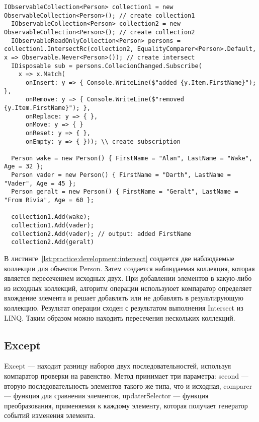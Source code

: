 \begin{lstlisting}[style=csharpinlinestyle, caption={Пример использования Intersect}, label=lst:practice:development:intersect]
  IObservableCollection<Person> collection1 = new ObservableCollection<Person>(); // create collection1
  IObservableCollection<Person> collection2 = new ObservableCollection<Person>(); // create collection2
  IObservableReadOnlyCollection<Person> persons = collection1.IntersectRc(collection2, EqualityComparer<Person>.Default, x => Observable.Never<Person>()); // create intersect
  IDisposable sub = persons.CollecionChanged.Subscribe(
    x => x.Match(
      onInsert: y => { Console.WriteLine($"added {y.Item.FirstName}"); },
      onRemove: y => { Console.WriteLine($"removed {y.Item.FirstName}"); },
      onReplace: y => { },
      onMove: y => { }
      onReset: y => { },
      onEmpty: y => { })); \\ create subscription

  Person wake = new Person() { FirstName = "Alan", LastName = "Wake", Age = 32 };
  Person vader = new Person() { FirstName = "Darth", LastName = "Vader", Age = 45 };
  Person geralt = new Person() { FirstName = "Geralt", LastName = "From Rivia", Age = 60 };

  collection1.Add(wake);
  collection1.Add(vader);
  collection2.Add(vader); // output: added FirstName
  collection2.Add(geralt)
\end{lstlisting}

В листинге~\ref{lst:practice:development:intersect} создается две наблюдаемые коллекции для объектов Person. Затем создается наблюдаемая коллекция, которая является пересечением исходных двух.
При добавлении элементов в какую-либо из исходных коллекций, алгоритм операции используюет компаратор определяет вхождение элемента и решает добавлять или не добавлять в результирующую коллекцию.
Результат операции сходен с результатом выполнения Intersect из LINQ. Таким образом можно находить пересечения нескольких коллекций.

\subsection{Except}
\label{sub:development:except}

Except --- находит разницу наборов двух последовательностей, используя компаратор проверки на равенство.
Метод принимает три параметра: second --- вторую последовательность элементов такого же типа, что и исходная,
comparer --- функция для сравнения элементов, updaterSelector --- функция преобразования, применяемая к каждому элементу, которая получает генератор событий изменения элемента.

